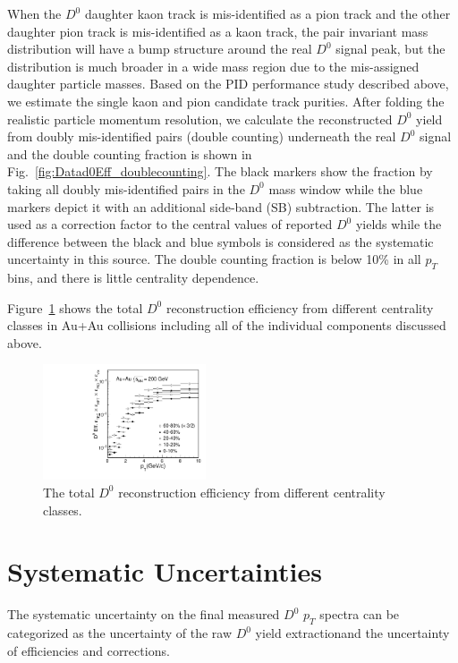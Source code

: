 \documentclass[%
 reprint,	
showpacs,
 amsmath,amssymb,
 aps,
 prc,
]{revtex4-1}
\providecommand{\DIFaddtex}[1]{{\protect\color{blue}\uwave{#1}}} %
\providecommand{\DIFaddbegin}{} %
\providecommand{\DIFaddend}{} %
\providecommand{\DIFadd}[1]{\texorpdfstring{\DIFaddtex{#1}}{#1}} %
\begin{document}
When the $D^0$ daughter kaon track is mis-identified as a pion track and the other daughter pion track is mis-identified as a kaon track, the pair invariant mass distribution will have a bump structure around the real $D^0$ signal peak, but the distribution is much broader in a wide mass region due to the mis-assigned daughter particle masses. Based on the PID  performance study described above, we estimate the single kaon and pion candidate track purities. After folding the realistic particle momentum resolution, we calculate the reconstructed $D^0$ yield from doubly mis-identified pairs (double counting) underneath the real $D^0$ signal and the double counting fraction is shown in Fig.~\ref{fig:Datad0Eff_doublecounting}. The black markers show the fraction by taking all doubly mis-identified pairs in the $D^0$ mass window while the blue markers depict it with an additional side-band (SB) subtraction. The latter is used as a correction factor to the central values of reported $D^0$ yields while the difference between the black and blue symbols is considered as the systematic uncertainty in this source. The double counting fraction is below 10\% in all $p_{T}$ bins, and there is little centrality dependence.

Figure~\ref{fig:Datad0Eff} shows the total $D^{0}$ reconstruction efficiency from different centrality classes in Au+Au collisions including all of the individual components discussed above.

\begin{figure}
\centering
\includegraphics[width=0.43\textwidth]{fig/Datad0Eff_10.pdf}
\caption{The total $D^{0}$ reconstruction efficiency from different centrality classes.}
\label{fig:Datad0Eff} 
\end{figure}

\section{Systematic Uncertainties}
\label{systematic}

The systematic uncertainty on the final measured $D^0$ $p_{T}$ spectra can be categorized as the uncertainty of the raw $D^0$ yield extraction\DIFaddbegin \DIFadd{, the BR uncertainty, }\DIFaddend and the uncertainty of efficiencies and corrections.
\end{document}
